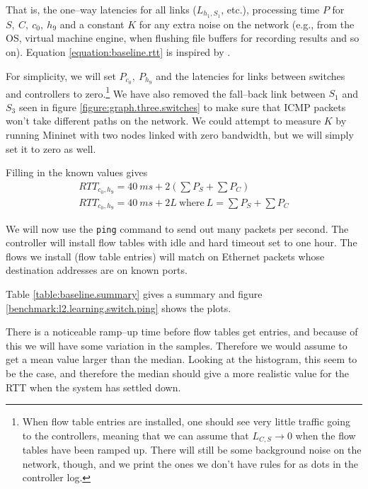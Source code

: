 That is, the one--way latencies for all links ($L_{h_1,S_1}$, etc.), processing time $P$ for
$S,~C,~c_0,~h_9$ and a constant $K$ for any extra noise on the network
(e.g., from the OS, virtual machine engine, when flushing file buffers for
 recording results and so on).
Equation \ref{equation:baseline.rtt} is inspired by \cite{DBLP:conf/cnsm/PhemiusB13}.

For simplicity, we will set $P_{c_0},~P_{h_9}$ and the
latencies for links between switches and controllers to zero.\footnote{When
flow table entries are installed, one should see very little traffic going
to the controllers, meaning that we can
assume that $L_{C,S} \to 0$ when the flow tables have been ramped up.
There will still be some background noise on the network, though, and we
print the ones we don't have rules for as dots in the controller log.}
We have also removed the fall--back link
between $S_1$ and $S_3$ seen in figure \ref{figure:graph.three.switches}
to make sure that ICMP packets won't take different paths on the network.
We could attempt to measure $K$ by running Mininet with two nodes linked
with zero bandwidth, but we will simply set it to zero as well.

Filling in the known values gives
\begin{gather}
  RTT_{c_0,h_9} = 40~ms + 2\left( \sum P_S + \sum P_C \right)
  \\
  RTT_{c_0,h_9} = 40~ms + 2L~\text{where}~L = \sum P_S + \sum P_C
  \label{equation:expected.baseline.rtt}
\end{gather}

We will now use the \texttt{ping} command to send out many packets per
second.  The controller will install flow tables with idle and hard timeout
set to one hour. The flows we install (flow table entries) will match on
Ethernet packets whose destination addresses are on known ports.

Table \ref{table:baseline.summary} gives a summary and figure
\ref{benchmark:l2.learning.switch.ping} shows the plots.



There is a noticeable ramp--up time before flow tables get entries, and
because of this we will have some variation in the samples. Therefore we
would assume to get a mean value larger than the median.  Looking at the
histogram, this seem to be the case, and therefore the median should give a
more realistic value for the RTT when the system has settled down.

